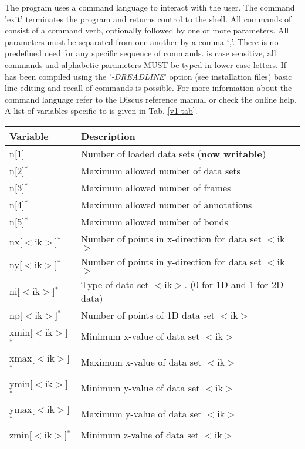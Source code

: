 %
The program uses a command language to interact with the user. The
command 'exit' terminates the program and returns control to the
shell.  All commands of \Kuplot consist of a command verb,
optionally followed by one or more parameters.  All parameters must
be separated from one another by a comma `,'. There is no predefined
need for any specific sequence of commands. \Kuplot is case
sensitive, all commands and alphabetic parameters MUST be typed in
lower case letters.  If \Kuplot has been compiled using the
'{\it -DREADLINE}' option (see installation files) basic line
editing and recall of commands is possible.  For more information
about the command language refer to the {\sc Discus} reference manual 
or check the online help. A list of variables specific to \Kuplot
is given in Tab. \ref{v1-tab}. 

\begin{table}[!tb]
\centering
\begin{tabularx}{\textwidth}{|p{40mm}|X|}
  \hline
  {\bf Variable} & {\bf Description} \\
  \hline \hline
  n[1]               & Number of loaded data sets ({\bf now writable})\\
  n[2]$^{*}$         & Maximum allowed number of data sets \\
  n[3]$^{*}$         & Maximum allowed number of frames \\
  n[4]$^{*}$         & Maximum allowed number of annotations \\
  n[5]$^{*}$         & Maximum allowed number of bonds \\
  \hline
  nx[$<$ik$>$]$^{*}$ & Number of points in x-direction for data set $<$ik$>$ \\
  ny[$<$ik$>$]$^{*}$ & Number of points in y-direction for data set $<$ik$>$ \\
  ni[$<$ik$>$]$^{*}$ & Type of data set $<$ik$>$. (0 for 1D
                       and 1 for 2D data) \\
  np[$<$ik$>$]$^{*}$ & Number of points of 1D data set $<$ik$>$ \\
  \hline
  xmin[$<$ik$>$]$^{*}$ & Minimum x-value of data set $<$ik$>$ \\
  xmax[$<$ik$>$]$^{*}$ & Maximum x-value of data set $<$ik$>$ \\
  ymin[$<$ik$>$]$^{*}$ & Minimum y-value of data set $<$ik$>$ \\
  ymax[$<$ik$>$]$^{*}$ & Maximum y-value of data set $<$ik$>$ \\
  zmin[$<$ik$>$]$^{*}$ & Minimum z-value of data set $<$ik$>$ \\

\end{tabularx}
\end{table}
